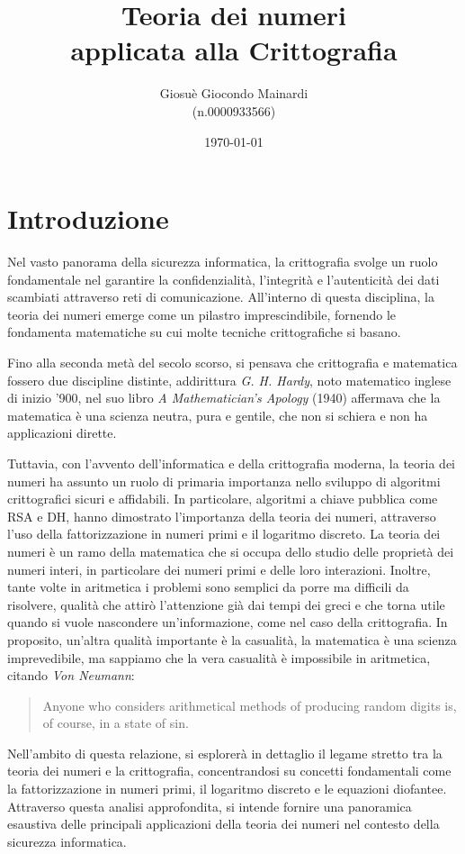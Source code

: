 \documentclass[a4paper,12pt]{report}
\title{Teoria dei numeri \\ applicata alla Crittografia}
\author{Giosuè Giocondo Mainardi\\ (n.0000933566)}
\date{\today}
\begin{document}
\maketitle

\tableofcontents
\chapter{Introduzione}
Nel vasto panorama della sicurezza informatica, la crittografia svolge un ruolo fondamentale nel garantire la confidenzialità, l'integrità e 
l'autenticità dei dati scambiati attraverso reti di comunicazione. All'interno di questa disciplina, la teoria dei numeri emerge come un 
pilastro imprescindibile, fornendo le fondamenta matematiche su cui molte tecniche crittografiche si basano.

Fino alla seconda metà del secolo scorso, si pensava che crittografia e matematica fossero due discipline distinte, 
addirittura \emph{G. H. Hardy}, noto matematico inglese di inizio '900, nel suo libro \emph{A Mathematician's Apology} (1940) affermava
che la matematica è una scienza neutra, pura e gentile, che non si schiera e non ha applicazioni dirette. 

Tuttavia, con l'avvento dell'informatica e della crittografia moderna, la teoria dei numeri ha assunto un ruolo di primaria importanza nello
sviluppo di algoritmi crittografici sicuri e affidabili. 
%
In particolare, algoritmi a chiave pubblica come RSA e DH, hanno dimostrato l'importanza della teoria dei numeri, attraverso l'uso della 
fattorizzazione in numeri primi e il logaritmo discreto.
%
La teoria dei numeri è un ramo della matematica che si occupa dello studio delle proprietà dei numeri interi, in particolare dei numeri primi e delle loro interazioni. 
Inoltre, tante volte in aritmetica i problemi sono semplici da porre ma difficili da risolvere, qualità che attirò l'attenzione già dai tempi 
dei greci e che torna utile quando si vuole nascondere un'informazione, come nel caso della crittografia.
In proposito, un'altra qualità importante è la casualità, la matematica è una scienza imprevedibile, ma sappiamo che la vera casualità è impossibile in aritmetica, citando \emph{Von Neumann}: 
\begin{quote}
	Anyone who considers arithmetical methods of producing random digits is, of course, in a state of sin.
\end{quote}

Nell'ambito di questa relazione, si esplorerà in dettaglio il legame stretto tra la teoria dei numeri e la crittografia, concentrandosi su concetti fondamentali come la fattorizzazione in numeri primi, il logaritmo discreto e le equazioni diofantee. Attraverso questa analisi approfondita, si intende fornire una panoramica esaustiva delle principali applicazioni della teoria dei numeri nel contesto della sicurezza informatica.
%
%
%
%
\end{document}
